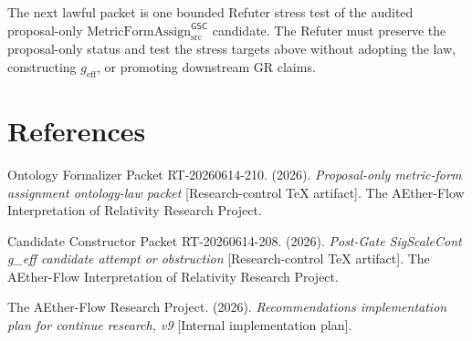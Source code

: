 \documentclass[11pt]{article}
\newcommand{\geff}{g_{\mathrm{eff}}}
\newcommand{\MetricFormAssign}{\mathrm{MetricFormAssign}_{\mathrm{src}}^{\mathsf{GSC}}}
\begin{document}
The next lawful packet is one bounded Refuter stress test of the audited
proposal-only \(\MetricFormAssign\) candidate. The Refuter must preserve the
proposal-only status and test the stress targets above without adopting the
law, constructing \(\geff\), or promoting downstream GR claims.

\section*{References}

Ontology Formalizer Packet RT-20260614-210. (2026). \textit{Proposal-only
metric-form assignment ontology-law packet} [Research-control TeX artifact].
The AEther-Flow Interpretation of Relativity Research Project.

Candidate Constructor Packet RT-20260614-208. (2026). \textit{Post-Gate
SigScaleCont g\_eff candidate attempt or obstruction} [Research-control TeX
artifact]. The AEther-Flow Interpretation of Relativity Research Project.

The AEther-Flow Research Project. (2026). \textit{Recommendations
implementation plan for continue research, v9} [Internal implementation plan].
\end{document}
